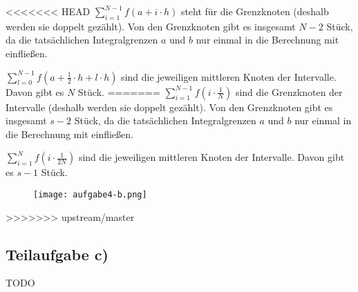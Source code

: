 <<<<<<< HEAD
$\sum_{i=1}^{N-1} f(a + i \cdot h)$ steht für die Grenzknoten
 (deshalb werden sie doppelt gezählt). Von den Grenzknoten gibt es 
insgesamt $N-2$ Stück, da die tatsächlichen Integralgrenzen $a$ und $b$ 
nur einmal in die Berechnung mit einfließen.

$\sum_{l=0}^{N-1} f(a + \frac{1}{2} \cdot h + l \cdot h)$ sind die jeweiligen 
mittleren Knoten der Intervalle. Davon gibt es $N$ Stück.
=======
$\sum_{i=1}^{N-1} f(i \cdot \frac{1}{N})$  sind die Grenzknoten der Intervalle
 (deshalb werden sie doppelt gezählt). Von den Grenzknoten gibt es
insgesamt $s-2$ Stück, da die tatsächlichen Integralgrenzen $a$ und $b$
nur einmal in die Berechnung mit einfließen.

$\sum_{i=1}^N f(i \cdot \frac{1}{2N})$ sind die jeweiligen
mittleren Knoten der Intervalle. Davon gibt es $s-1$ Stück.

\begin{figure}[h]
    \centering
    \texttt{[image: aufgabe4-b.png]}
\end{figure}
>>>>>>> upstream/master

\subsection*{Teilaufgabe c)}
TODO
